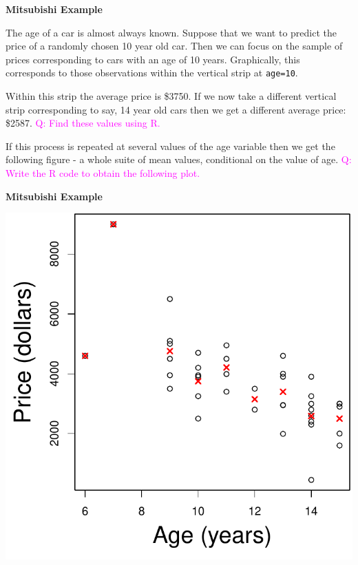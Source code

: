 \documentclass[landscape]{slides}
\newcommand{\heading}[1]{%
  \begin{center}
    \large\bf \color{red}
        #1
  \end{center}
  \vspace{1ex minus 1ex}}
\begin{document}
\begin{slide}
\heading{Mitsubishi Example}

The age of a car is almost always known. Suppose that we want to predict the 
price of a randomly chosen 10 year old car. Then we can focus on the sample of
prices corresponding to cars with an age of 10 years. Graphically, this
corresponds to those observations within the vertical strip at {\tt age=10}.

Within this strip the average price is \$3750. If we now take a different
vertical strip corresponding to say, 14 year old cars then we get a different 
average price: \$2587. 
\textcolor{magenta}{Q: Find these values using R.}

If this process is repeated at several values of the age variable then we get
the following figure - a whole suite of mean values, conditional on the value of
age.
\textcolor{magenta}{Q: Write the R code to obtain the following plot.}

\end{slide}
\begin{slide}
\heading{Mitsubishi Example}

\begin{center}
\includegraphics{figures/7-LinearModels-Figures/agepricex.pdf}
\end{center}
\end{slide}
\end{document}
